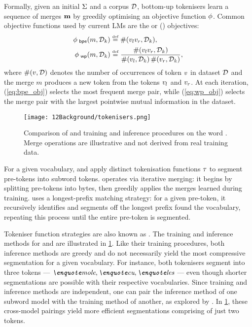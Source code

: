 Formally, given an initial $\Sigma$ and a corpus $\mathcal{D}$, bottom-up tokenisers learn a sequence of merges $\mathbf{m}$ by greedily optimising an objective function $\phi$. Common objective functions used by current LMs are the \bpe or \wordpiecefull (\wordpiece) objectives:
\begin{align}
    \bpeob(\merge, \dataset_k) &\defeq 
    \countfn(\lefttoken \righttoken, \dataset_k) \label{eq:bpe_obj}, \\
     \wpob(\merge, \dataset_k) &\defeq 
    \frac{
    \countfn(\lefttoken \righttoken, \dataset_k)}{\countfn(\lefttoken, \dataset_k)\,\countfn(\righttoken, \dataset_k)}, \label{eq:wp_obj}
\end{align}
where $\#(v, \mathcal{D})$ denotes the number of occurrences of token $v$ in dataset $\mathcal{D}$ and the merge $m$ produces a new token from the tokens $v_l$ and $v_r$. At each iteration, \bpe (\cref{eq:bpe_obj}) selects the most frequent merge pair, while \wordpiecefull (\cref{eq:wp_obj}) selects the merge pair with the largest pointwise mutual information in the dataset.

\begin{figure}[t]
    \centering
    \texttt{[image: 12Background/tokenisers.png]}
    \caption{Comparison of \bpe and \wordpiecefull training and inference procedures on the word . Merge operations are illustrative and not derived from real training data.}
    \label{fig:12-tokenisers}
\end{figure}

For a given vocabulary, \bpe and \wordpiecefull apply distinct tokenisation functions $\tau$ to segment pre-tokens into subword tokens. \bpe operates via iterative merging: it begins by splitting pre-tokens into bytes, then greedily applies the merges learned during training. \wordpiecefull uses a longest-prefix matching strategy: for a given pre-token, it recursively identifies and segments off the longest prefix found the vocabulary, repeating this process until the entire pre-token is segmented.

Tokeniser function strategies are also known as . The training and inference methods for \bpe and \wordpiecefull are illustrated in \cref{fig:12-tokenisers}. Like their training procedures, both inference methods are greedy and do not necessarily yield the most compressive segmentation for a given vocabulary. For instance, both tokenisers segment  into three tokens --- ${\ex{mole},\ex{cu},\ex{les}}$ --- even though shorter segmentations are possible with their respective vocabularies. Since training and inference methods are independent, one can pair the inference method of one subword model with the training method of another, as explored by \citet{uzan-etal-2024-greed}. In \cref{fig:12-tokenisers}, these cross-model pairings yield more efficient segmentations comprising of just two tokens.

